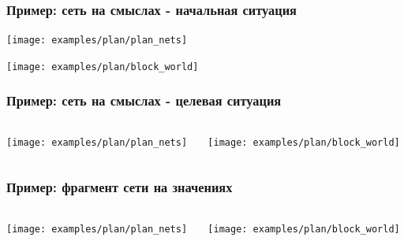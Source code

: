 \documentclass[default]{beamer}
\begin{document}
	\begin{frame}
		\frametitle{Пример: сеть на смыслах - начальная ситуация}
		
		\centering
		\texttt{[image: examples/plan/plan\_nets]}
		\par\bigskip
		\texttt{[image: examples/plan/block\_world]}
		
		
	\end{frame}	
	
	\begin{frame}
		\frametitle{Пример: сеть на смыслах - целевая ситуация}
		\begin{columns}
			\begin{column}{0.7\textwidth}
				\centering
				\texttt{[image: examples/plan/plan\_nets]}
			\end{column}
			\begin{column}{0.3\textwidth}
				\centering
				\texttt{[image: examples/plan/block\_world]}
			\end{column}
		\end{columns}
	\end{frame}	
	
	\begin{frame}
		\frametitle{Пример: фрагмент сети на значениях}
		\begin{columns}
			\begin{column}{0.7\textwidth}
				\centering
				\texttt{[image: examples/plan/plan\_nets]}
			\end{column}
			\begin{column}{0.3\textwidth}
				\centering
				\texttt{[image: examples/plan/block\_world]}
			\end{column}
		\end{columns}
	\end{frame}
	
\end{document}
